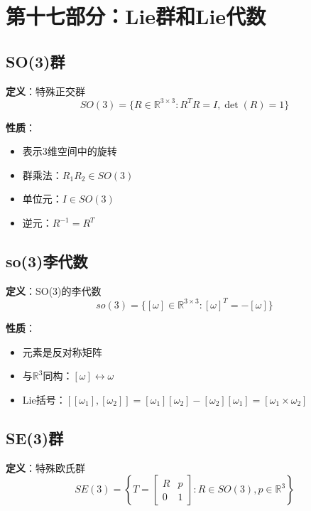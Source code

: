 \documentclass[12pt,a4paper]{article}
\begin{document}
\section{第十七部分：Lie群和Lie代数}

\subsection{SO(3)群}

\textbf{定义}：特殊正交群
\begin{equation}
SO(3) = \{R \in \mathbb{R}^{3 \times 3} : R^T R = I, \det(R) = 1\}
\end{equation}

\textbf{性质}：
\begin{itemize}
\item 表示3维空间中的旋转
\item 群乘法：$R_1 R_2 \in SO(3)$
\item 单位元：$I \in SO(3)$
\item 逆元：$R^{-1} = R^T$
\end{itemize}

\subsection{so(3)李代数}

\textbf{定义}：SO(3)的李代数
\begin{equation}
so(3) = \{[\omega] \in \mathbb{R}^{3 \times 3} : [\omega]^T = -[\omega]\}
\end{equation}

\textbf{性质}：
\begin{itemize}
\item 元素是反对称矩阵
\item 与$\mathbb{R}^3$同构：$[\omega] \leftrightarrow \omega$
\item Lie括号：$[[\omega_1], [\omega_2]] = [\omega_1][\omega_2] - [\omega_2][\omega_1] = [\omega_1 \times \omega_2]$
\end{itemize}

\subsection{SE(3)群}

\textbf{定义}：特殊欧氏群
\begin{equation}
SE(3) = \left\{T = \begin{bmatrix} R & p \\ 0 & 1 \end{bmatrix} : R \in SO(3), p \in \mathbb{R}^3 \right\}
\end{equation}
\end{document}
